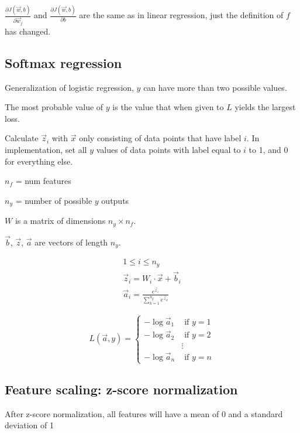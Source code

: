 \documentclass[12pt]{article}
\begin{document}
$\frac{\partial J(\vec{w},b)}{\partial \vec{w}_j}$ and $\frac{\partial J(\vec{w},b)}{\partial b}$ are the same as in linear regression, just the definition of $f$ has changed.

\subsection{Softmax regression}

Generalization of logistic regression, $y$ can have more than two possible values.

The most probable value of $y$ is the value that when given to $L$ yields the largest loss.

Calculate $\vec{z}_i$ with $\vec{x}$ only consisting of data points that have label $i$. In implementation, set all $y$ values of data points with label equal to $i$ to 1, and 0 for everything else.

$n_f$ = num features

$n_y$ = number of possible $y$ outputs

$W$ is a matrix of dimensions $n_y \times n_f$.

$\vec{b}$, $\vec{z}$, $\vec{a}$ are vectors of length $n_y$.

\begin{gather*}
    1 \leq i \leq n_y\\
    \vec{z}_i = W_i \cdot \vec{x} + \vec{b}_i\\
    \vec{a}_i = \frac{e^{\vec{z}_i}}{\sum_{k=1}^{n_y} e^{\vec{z}_k}}
\end{gather*}

\begin{equation}
L(\vec{a}, y) =
  \left\{
    \begin{aligned}
    -\log \vec{a}_1 &\text{ if } y = 1\\
    -\log \vec{a}_2 &\text{ if } y = 2\\
    & \vdots\\
    -\log \vec{a}_n &\text{ if } y = n
    \end{aligned}
   \right.
\end{equation}

\subsection{Feature scaling: z-score normalization}

After z-score normalization, all features will have a mean of 0 and a standard deviation of 1
\end{document}
